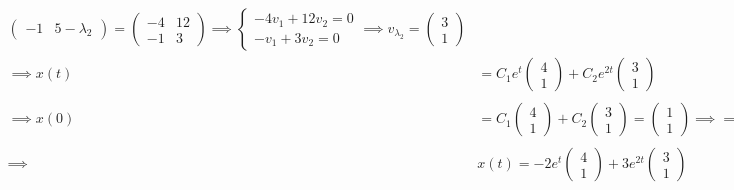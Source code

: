 \documentclass[12pt]{article}
\begin{document}
\begin{enumerate}
\begin{align*}
\begin{pmatrix}
                -1 & 5 - \lambda_2
            \end{pmatrix} = \begin{pmatrix}
                -4 & 12\\
                -1 & 3
            \end{pmatrix} \implies \begin{cases} 
                -4v_1 + 12v_2 = 0\\
                -v_1 + 3v_2 = 0
            \end{cases} \implies v_{\lambda_2} = \begin{pmatrix}
                3\\ 1
            \end{pmatrix}\\
            \implies x(t) &= C_1 e^{t}\begin{pmatrix}
                4\\ 1
            \end{pmatrix} + C_2 e^{2t} \begin{pmatrix}
                3\\ 1
            \end{pmatrix}\\
            \implies x(0) &= C_1 \begin{pmatrix}
                4\\1
            \end{pmatrix} + C_2 \begin{pmatrix}
                3\\1
            \end{pmatrix} = \begin{pmatrix}
                1\\1
            \end{pmatrix} \implies \implies \begin{cases}
                4C_1 + 3C_2 = 1\\
                C_1 + C_2 = 1
            \end{cases} \implies C_1 = -2, \; C_2 = 3\\ 
            \implies &\boxed{x(t) = -2e^{t}\begin{pmatrix}
                4\\ 1
            \end{pmatrix} + 3e^{2t} \begin{pmatrix} 
                3\\ 1
            \end{pmatrix}}
        \end{align*}
    \color{black}
\pagebreak



\end{enumerate}
\end{document}
